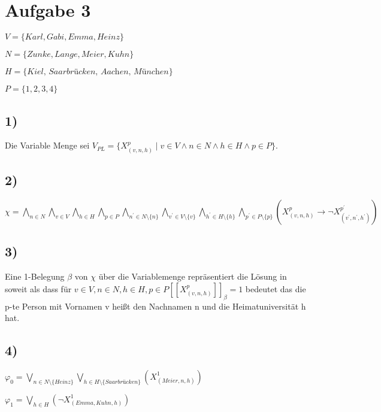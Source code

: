 \section*{Aufgabe 3}

$V = \lbrace Karl, Gabi, Emma, Heinz \rbrace$

$N = \lbrace Zunke, Lange, Meier, Kuhn \rbrace$

$H = \lbrace \textit{Kiel, Saarbrücken, Aachen, München} \rbrace$

$P = \lbrace 1,2,3,4 \rbrace$

\subsection*{1)}

Die Variable Menge sei $V_{PL} = \lbrace X_{(v,n,h)}^p \mid v \in V \wedge n \in N \wedge h \in H \wedge p \in P\rbrace$.

\subsection*{2)}

$\chi = 
\bigwedge\limits_{n \in N}\bigwedge\limits_{v \in V}\bigwedge\limits_{h \in H}\bigwedge\limits_{p \in P}
\bigwedge\limits_{n^{\prime } \in N \setminus \{n\}}\bigwedge\limits_{v^{\prime } \in V\setminus \{v\}}\bigwedge\limits_{h^{\prime } \in H\setminus \{h\}}\bigwedge\limits_{p^{\prime } \in P\setminus \{p\}}
(X_{(v,n,h)}^p \rightarrow \neg  X_{(v^{\prime },n^{\prime },h^{\prime })}^{p^{\prime }})$

\subsection*{3)}

Eine 1-Belegung $\beta$ von $\chi$ über die Variablemenge repräsentiert die Lösung in soweit als dass für $v \in V, n \in N, h \in H, p \in P [\![X_{(v,n,h)}^p]\!]_\beta = 1$ bedeutet das die p-te Person mit Vornamen v heißt den Nachnamen n und die Heimatuniversität h hat.

\subsection*{4)}

$\varphi_0 = \bigvee\limits_{n \in N \setminus \{Heinz\}} \bigvee\limits_{h \in H \setminus \{\textit{Saarbrücken}\}} (X^1_{(Meier,n,h)})$

$\varphi_1 = \bigvee\limits_{h \in H} (\neg X^1_{(Emma,Kuhn,h)})$

